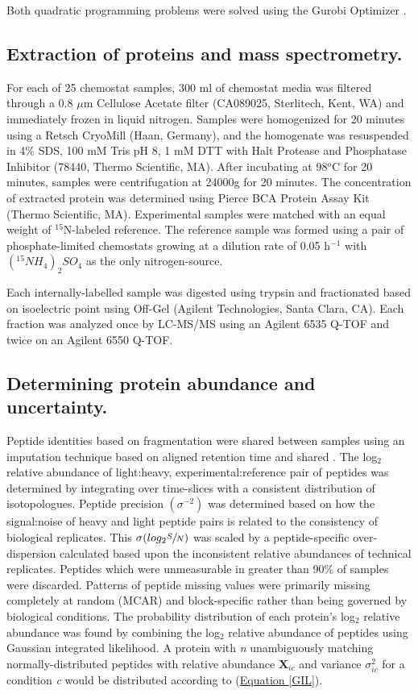 Both quadratic programming problems were solved using the Gurobi Optimizer \cite{Anonymous:WfN-MQJY}.

\subsection*{Extraction of proteins and mass spectrometry.}

For each of 25 chemostat samples, 300 ml of chemostat media was filtered through a 0.8 $\mu$m Cellulose Acetate filter (CA089025, Sterlitech, Kent, WA) and immediately frozen in liquid nitrogen.  Samples were homogenized for 20 minutes using a Retsch CryoMill (Haan, Germany), and the homogenate was resuspended in 4\% SDS, 100 mM Tris pH 8, 1 mM DTT with Halt Protease and Phosphatase Inhibitor (78440, Thermo Scientific, MA).  After incubating at 98$^{o}$C for 20 minutes, samples were centrifugation at 24000g for 20 minutes.  The concentration of extracted protein was determined using Pierce BCA Protein Assay Kit (Thermo Scientific, MA).  Experimental samples were matched with an equal weight of $^{15}$N-labeled reference.  The reference sample was formed using a pair of phosphate-limited chemostats growing at a dilution rate of 0.05 h$^{-1}$ with $(^{15}NH_{4})_{2}SO_{4}$ as the only nitrogen-source.

Each internally-labelled sample was digested using trypsin and fractionated based on isoelectric point using Off-Gel (Agilent Technologies, Santa Clara, CA). Each fraction was analyzed once by LC-MS/MS using an Agilent 6535 Q-TOF and twice on an Agilent 6550 Q-TOF.

\subsection*{Determining protein abundance and uncertainty.}

Peptide identities based on fragmentation were shared between samples using an imputation technique based on aligned retention time and shared . The log$_{2}$ relative abundance of light:heavy, experimental:reference pair of peptides was determined by integrating over time-slices with a consistent distribution of isotopologues. Peptide precision $\left(\sigma^{-2}\right)$ was determined based on how the signal:noise of heavy and light peptide pairs is related to the consistency of biological replicates.  This $\sigma(log_{2}\sfrac{S}{N})$ was scaled by a peptide-specific over-dispersion calculated based upon the inconsistent relative abundances of technical replicates.  Peptides which were unmeasurable in greater than 90\% of samples were discarded.  Patterns of peptide missing values were primarily missing completely at random (MCAR) and block-specific rather than being governed by biological conditions.  The probability distribution of each protein's log$_{2}$ relative abundance was found by combining the log$_{2}$ relative abundance of peptides using Gaussian integrated likelihood.  A protein with \textit{n} unambiguously matching normally-distributed peptides with relative abundance $\textbf{X}_{ic}$ and variance $\sigma^{2}_{ic}$ for a condition \textit{c} would be distributed according to (\hyperref[GIL]{Equation \ref{GIL}}).

